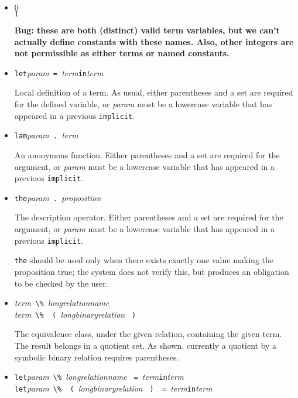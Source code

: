 \documentclass[11pt]{article}
\newcommand{\keywd}[1]{\mbox{\texttt{#1}}\xspace}
\newcommand{\IMPLICIT}{\keywd{implicit}}
\newcommand{\IN}{\keywd{in}}
\newcommand{\LAMBDA}{\keywd{lam}}
\newcommand{\LET}{\keywd{let}}
\newcommand{\THE}{\keywd{the}}
\newcommand{\metav}[1]{\mbox{\textit{#1}}\xspace}
\newcommand{\Label}{\metav{\Verb|`|label}}
\newcommand{\Proposition}{\metav{proposition}}
\newcommand{\Param}{\metav{param}}
\newcommand{\Term}{\metav{term}}
\newcommand{\EQUALS}{\mbox{\Verb| = |}}
\newcommand{\LPAREN}{\mbox{\Verb| ( |}}
\newcommand{\PERCENT}{\mbox{\Verb+ \% +}}
\newcommand{\RPAREN}{\mbox{\Verb| ) |}}
\newcommand{\PERIOD}{\mbox{\Verb| . |}}
\newcommand{\NB}{\textbf{NB: }}
\begin{document}
\begin{itemize}
  \NB A single identifier in a pattern-matching case need not
  be described in an \IMPLICIT; there is enough information from
  looking at the \Term and the \Label.

\item $0$\\
      $1$

  \textbf{Bug: these are both (distinct) valid term variables, but we can't actually
  define constants with these names.  Also, other integers are not permissible
  as either terms or named constants.}

\item \LET \Param \EQUALS \Term \IN \Term
  
  Local definition of a term.  As usual, either parentheses and a set
  are required for the defined variable, or \Param must be a lowercase
  variable that has appeared in a previous \IMPLICIT.

\item \LAMBDA \Param \PERIOD \Term
  
  An anonymous function.  Either parentheses and a set are required
  for the argument, or \Param must be a lowercase variable that has
  appeared in a previous \IMPLICIT.

\item \THE \Param \PERIOD \Proposition

  The description operator.  Either parentheses and a set are required
  for the argument, or \Param must be a lowercase variable that has
  appeared in a previous \IMPLICIT.  

  \THE should be used only when there exists exactly one value making
  the proposition true; the system does not verify this, but produces
  an obligation to be checked by the user.

\item \Term \PERCENT \metav{longrelationname}\\
      \Term \PERCENT \LPAREN \metav{longbinaryrelation} \RPAREN

  The equivalence class, under the given relation, containing the
  given term.  The result belongs in a quotient set.  As shown,
  currently a quotient by a symbolic binary relation requires
  parentheses.

\item \LET \Param \PERCENT \metav{longrelationname} \EQUALS \Term \IN \Term\\
      \LET \Param \PERCENT \LPAREN \metav{longbinaryrelation} \RPAREN \EQUALS \Term \IN \Term\\


\end{itemize}
\end{document}

